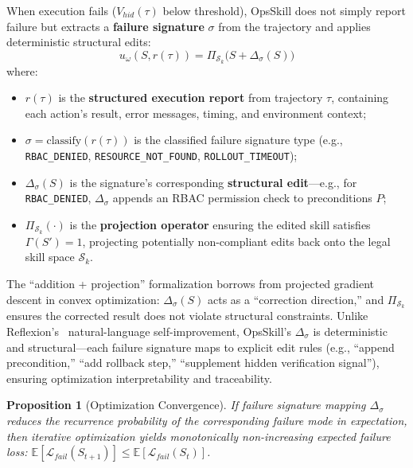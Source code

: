 \documentclass[conference,10pt]{IEEEtran}
\newtheorem{proposition}{Proposition}
\begin{document}
When execution fails ($V_{hid}(\tau)$ below threshold), OpsSkill does not simply report failure but extracts a \textbf{failure signature} $\sigma$ from the trajectory and applies deterministic structural edits:
\begin{equation}
u_\omega(S, r(\tau)) = \Pi_{\mathcal{S}_k}\big(S + \Delta_\sigma(S)\big)
\end{equation}
where:
\begin{itemize}
  \item $r(\tau)$ is the \textbf{structured execution report} from trajectory $\tau$, containing each action's result, error messages, timing, and environment context;
  \item $\sigma = \text{classify}(r(\tau))$ is the classified failure signature type (e.g., \texttt{RBAC\_DENIED}, \texttt{RESOURCE\_NOT\_FOUND}, \texttt{ROLLOUT\_TIMEOUT});
  \item $\Delta_\sigma(S)$ is the signature's corresponding \textbf{structural edit}---e.g., for \texttt{RBAC\_DENIED}, $\Delta_\sigma$ appends an RBAC permission check to preconditions $P$;
  \item $\Pi_{\mathcal{S}_k}(\cdot)$ is the \textbf{projection operator} ensuring the edited skill satisfies $\Gamma(S')=1$, projecting potentially non-compliant edits back onto the legal skill space $\mathcal{S}_k$.
\end{itemize}
The ``addition + projection'' formalization borrows from projected gradient descent in convex optimization: $\Delta_\sigma(S)$ acts as a ``correction direction,'' and $\Pi_{\mathcal{S}_k}$ ensures the corrected result does not violate structural constraints.
Unlike Reflexion's~\cite{shinn2023reflexion} natural-language self-improvement, OpsSkill's $\Delta_\sigma$ is deterministic and structural---each failure signature maps to explicit edit rules (e.g., ``append precondition,'' ``add rollback step,'' ``supplement hidden verification signal''), ensuring optimization interpretability and traceability.

\begin{proposition}[Optimization Convergence]
If failure signature mapping $\Delta_\sigma$ reduces the recurrence probability of the corresponding failure mode in expectation, then iterative optimization yields monotonically non-increasing expected failure loss: $\mathbb{E}[\mathcal{L}_{fail}(S_{t+1})] \le \mathbb{E}[\mathcal{L}_{fail}(S_t)]$.
\end{proposition}
\end{document}
